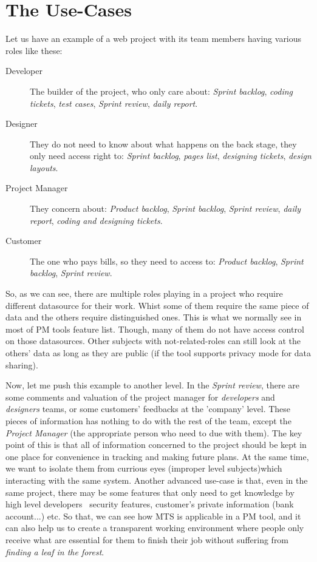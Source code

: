 
\section{The Use-Cases}
\label{ch:introduction:use_cases}
Let us have an example of a web project with its team members having various roles like these:
\begin{description}
\item[Developer] The builder of the project, who only care about: \emph{Sprint backlog}, \emph{coding tickets}, \emph{test cases}, \emph{Sprint review}, \emph{daily report}.
\item[Designer] They do not need to know about what happens on the back stage, they only need access right to: \emph{Sprint backlog}, \emph{pages list}, \emph{designing tickets}, \emph{design layouts}.
\item[Project Manager] They concern about: \emph{Product backlog}, \emph{Sprint backlog}, \emph{Sprint review}, \emph{daily report}, \emph{coding and designing tickets}.
\item[Customer] The one who pays bills, so they need to access to: \emph{Product backlog}, \emph{Sprint backlog}, \emph{Sprint review}.
\end{description}

So, as we can see, there are multiple roles playing in a project who require different datasource for their work.
Whist some of them require the same piece of data and the others require distinguished ones.
This is what we normally see in most of PM tools feature list.
Though, many of them do not have access control on those datasources.
Other subjects with not-related-roles can still look at the others' data as long as they are public (if the tool supports privacy mode for data sharing).

Now, let me push this example to another level. In the \emph{Sprint review}, there are some comments and valuation of the project manager for \emph{developers} and \emph{designers} teams, or some customers' feedbacks at the 'company' level.
These pieces of information has nothing to do with the rest of the team, except the \emph{Project Manager} (\ie the appropriate person who need to due with them).
The key point of this is that all of information concerned to the project should be kept in one place for convenience in tracking and making future plans.
At the same time, we want to isolate them from currious eyes (\ie improper level subjects)which interacting with the same system.
Another advanced use-case is that, even in the same project, there may be some features that only need to get knowledge by high level developers \eg\, security features, customer's private information (bank account...) etc.
So that, we can see how MTS is applicable in a PM tool, and it can also help us to create a transparent working environment where people only receive what are essential for them to finish their job without suffering from \emph{finding a leaf in the forest}.

